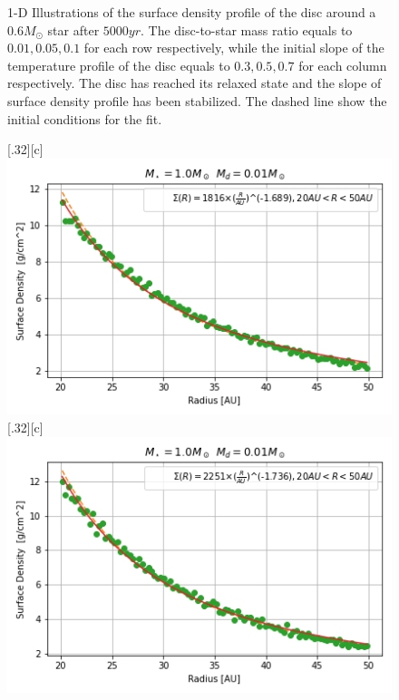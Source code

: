 \documentclass[aps,prb,twocolumn,superscriptaddress,floatfix,longbibliography]{revtex4-2}
\begin{document}
\begin{appendices}
\begin{figure}[!htbp]
  \caption{1-D Illustrations of the surface density profile of the disc around a $0.6 M_{\odot}$ star after $5000yr$. The disc-to-star mass ratio equals to $0.01, 0.05, 0.1$ for each row respectively, while the initial slope of the temperature profile of the disc equals to $0.3, 0.5, 0.7$ for each column respectively. The disc has reached its relaxed state and the slope of surface density profile has been stabilized. The dashed line show the initial conditions for the fit.}
\end{figure}
  
\begin{figure}[!htbp]\vspace*{4cm}
  \centering
  \subcaptionbox*{}[.32\linewidth][c]{%
    \includegraphics[width=\linewidth]{Graphs_1D/r_1s_0.01d_0.3q_1D.png}}\quad
  \subcaptionbox*{}[.32\linewidth][c]{%
    \includegraphics[width=\linewidth]{Graphs_1D/r_1s_0.01d_0.5q_1D.png}}\quad

\end{figure}
\end{appendices}
\end{document}
